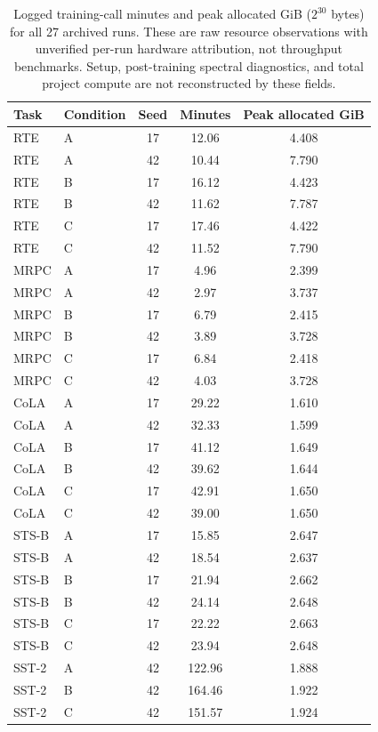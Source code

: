 \documentclass{article}
\begin{document}
\begin{table}[ht]
\centering
\caption{Logged training-call minutes and peak allocated GiB ($2^{30}$ bytes) for all 27 archived runs. These are raw resource observations with unverified per-run hardware attribution, not throughput benchmarks. Setup, post-training spectral diagnostics, and total project compute are not reconstructed by these fields.}
\label{tab:loggedcost}
\begin{tabular}{llccc}
\toprule
Task & Condition & Seed & Minutes & Peak allocated GiB\\
\midrule
RTE & A & 17 & 12.06 & 4.408 \\
RTE & A & 42 & 10.44 & 7.790 \\
RTE & B & 17 & 16.12 & 4.423 \\
RTE & B & 42 & 11.62 & 7.787 \\
RTE & C & 17 & 17.46 & 4.422 \\
RTE & C & 42 & 11.52 & 7.790 \\
\midrule
MRPC & A & 17 & 4.96 & 2.399 \\
MRPC & A & 42 & 2.97 & 3.737 \\
MRPC & B & 17 & 6.79 & 2.415 \\
MRPC & B & 42 & 3.89 & 3.728 \\
MRPC & C & 17 & 6.84 & 2.418 \\
MRPC & C & 42 & 4.03 & 3.728 \\
\midrule
CoLA & A & 17 & 29.22 & 1.610 \\
CoLA & A & 42 & 32.33 & 1.599 \\
CoLA & B & 17 & 41.12 & 1.649 \\
CoLA & B & 42 & 39.62 & 1.644 \\
CoLA & C & 17 & 42.91 & 1.650 \\
CoLA & C & 42 & 39.00 & 1.650 \\
\midrule
STS-B & A & 17 & 15.85 & 2.647 \\
STS-B & A & 42 & 18.54 & 2.637 \\
STS-B & B & 17 & 21.94 & 2.662 \\
STS-B & B & 42 & 24.14 & 2.648 \\
STS-B & C & 17 & 22.22 & 2.663 \\
STS-B & C & 42 & 23.94 & 2.648 \\
\midrule
SST-2 & A & 42 & 122.96 & 1.888 \\
SST-2 & B & 42 & 164.46 & 1.922 \\
SST-2 & C & 42 & 151.57 & 1.924 \\
\bottomrule
\end{tabular}
\end{table}
\end{document}

